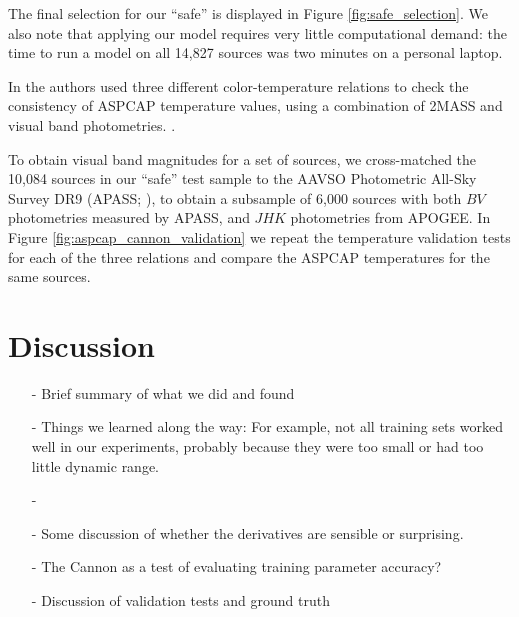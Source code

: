 \documentclass[preprint]{aastex62}
\begin{document}
The final selection for our ``safe'' is displayed in Figure \ref{fig:safe_selection}. We also note that applying our model requires very little computational demand: the time to run a model on all 14,827 sources was two minutes on a personal laptop.

In \citealt{Schmidt:2016} the authors used three different color-temperature relations to check the consistency of ASPCAP temperature values, using a combination of 2MASS and visual band photometries. \color{black}. 

To obtain visual band magnitudes for a set of sources, we cross-matched the 10,084 sources in our ``safe'' test sample to the AAVSO Photometric All-Sky Survey DR9 (APASS; \citealt{Henden:2016}), to obtain a subsample of 6,000 sources with both $BV$ photometries measured by APASS, and $JHK$ photometries from APOGEE. In Figure \ref{fig:aspcap_cannon_validation} we repeat the temperature validation tests for each of the three relations and compare the ASPCAP temperatures for the same sources. \color{gcolor}{Comments about validation results and the uncertainty of our Cannon temperatures...}\color{black}

\section{Discussion} \label{sec:discussion}

\begin{enumerate}
\item[-] Brief summary of what we did and found{}

\item[-] Things we learned along the way: For example, not all training sets worked well in our experiments, probably because they were too small or had too little dynamic range.

\item[-] \color{gcolor}{HOGG: Some discussion of precision and accuracy: The Cannon can produce precise results, but is only as accurate as its training set.}\color{black}

\item[-] Some discussion of whether the derivatives are sensible or surprising. 

\item[-] The Cannon as a test of evaluating training parameter accuracy? \color{gcolor}{HOGG: Should this be precision, not accuracy? For example adding a constant factor (say adding +1000 to every metallicity training value) does not change the scatter of the test labels}\color{black}

\item[-] Discussion of validation tests and ground truth
\end{enumerate}
\end{document}
